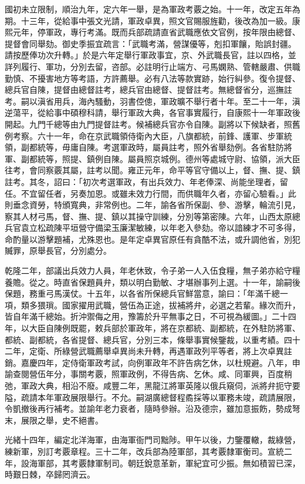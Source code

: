 \begin{pinyinscope}
國初未立限制，順治九年，定六年一舉，是為軍政考覈之始。十一年，改定五年為期。十三年，從給事中張文光請，軍政卓異，照文官賜服旌勸，後改為加一級。康熙元年，停軍政，專行考滿。既而兵部疏請直省武職應依文官例，按年限由總督、提督會同舉劾。御史季振宜疏言：「武職考滿，營謀優等，剋扣軍饟，貽誤封疆。請按歷俸功次升轉。」於是六年定舉行軍政事宜，京、外武職長官，註以四格，並詳列履行、軍功，分別去留，咨部。必註明行止端方、弓馬嫻熟、管轄嚴肅、供職勤慎、不擾害地方等考語，方許薦舉。必有八法等款實跡，始行糾參。復令提督、總兵官自陳，提督由總督註考，總兵官由總督、提督註考。無總督省分，巡撫註考。嗣以滇省用兵，海內騷動，羽書倥傯，軍政曠不舉行者十年。至二十一年，滇逆蕩平，從給事中碩穆科請，舉行軍政大典，各官事實履行，自康熙十一年軍政後開起。九門千總等由九門提督註考。候補總兵官亦令自陳。副將以下候缺者，照舊例考察。六十一年，命在京武職領侍衛內大臣，八旗都統，前鋒、護軍、步軍統領，副都統等，毋庸自陳。考選軍政時，屬員註考，照外省舉劾例。各省駐防將軍、副都統等，照提、鎮例自陳。屬員照京城例。德州等處城守尉、協領，派大臣往考，會同察覈其屬，註考以聞。雍正元年，命平等官守備以上，督、撫、提、鎮註考。其冬，詔曰：「初次考選軍政，有出兵效力、年老俸深、尚能坐理者，留任。不宜留任者，另奏加恩。或雖未效力行間，而供職年久者，亦留心驗看。」此則垂念資勞，特頒寬典，非常例也。二年，諭各省所保副、參、游擊，輪流引見，察其人材弓馬，督、撫、提、鎮以其操守訓練，分別等第密陳。六年，山西太原總兵官袁立松疏陳平垣營守備梁玉廉潔敏練，以年老入參劾。帝以諳練才不可多得，命酌量以游擊題補，尤殊恩也。是年定卓異官原任有貪酷不法，或升調他省，別犯贓罪，原舉長官，分別處分。

乾隆二年，部議出兵效力人員，年老休致，令子弟一人入伍食糧，無子弟亦給守糧養贍。從之。時直省保題員弁，類以明白勤敏、才堪辦事列上選。十一年，諭嗣後保題，務重弓馬漢仗。十五年，以各省所保總兵官鮮當意，諭曰：「年滿千總一項，類多猥瑣。國家擢用武職，營伍為正途，拔補將弁，必選之若輩。緣次而升，皆自年滿千總始。折沖禦侮之用，豫籌於升平無事之日，不可視為緩圖。」二十四年，以大臣自陳例既罷，敕兵部於軍政年，將在京都統、副都統，在外駐防將軍、都統、副都統，各省提督、總兵官，分別三本，條舉事實候鑒裁，以重考績。四十二年，定衛、所綠營武職薦舉卓異尚未升轉，再遇軍政列平等者，將上次卓異註銷。嘉慶四年，定侍衛軍政考試，向例軍政年不許告病乞休，以杜規避。八年，申諭查閱營伍年分，事關考覈，照軍政例，不得告病、乞休。咸、同軍興，百度稍弛，軍政大典，相沿不廢。咸豐二年，黑龍江將軍英隆以俄兵窺伺，派將弁扼守要隘，疏請本年軍政展限舉行。不允。嗣湖廣總督程矞採等以軍務未竣，疏請展限，令凱撤後再行補考。並諭年老力衰者，隨時參辦。沿及德宗，雖加意振飭，勢成弩末，展限之舉，史不絕書。

光緒十四年，編定北洋海軍，由海軍衙門司黜陟。甲午以後，力鑒覆轍，裁綠營，練新軍，別訂考覈章程。三十二年，改兵部為陸軍部，其考覈隸軍衡司。宣統二年，設海軍部，其考覈隸軍制司。朝廷銳意革新，軍紀宜可少振。無如積習已深，時艱日棘，卒歸罔濟云。


\end{pinyinscope}